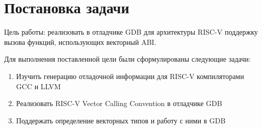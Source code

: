 \section{Постановка задачи}
\label{sec:Goal} 

Цель работы: реализовать в отладчике GDB для архитектуры RISC-V поддержку вызова функций,
использующих векторный ABI. 

Для выполнения поставленной цели были сформулированы следующие задачи:

\begin{enumerate}
	\item Изучить генерацию отладочной информации для RISC-V компиляторами GCC и LLVM
	\item Реализовать RISC-V Vector Calling Convention в отладчике GDB
	\item Поддержать определение векторных типов и работу с ними в GDB
\end{enumerate}

\newpage
